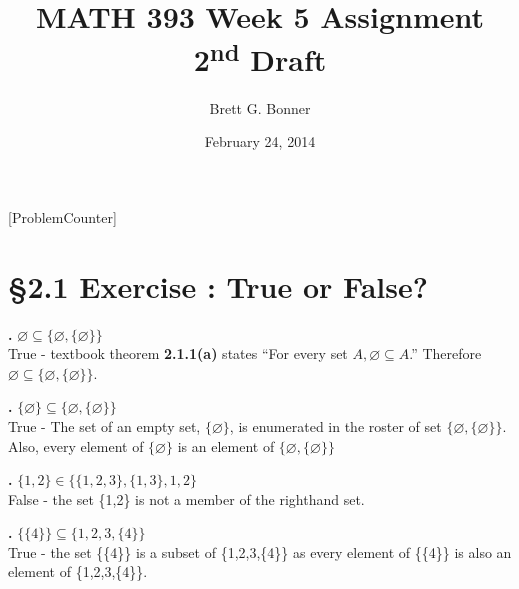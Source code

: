 \documentclass[a4paper,11pt]{article}
\begin{document}
\newtheorem*{theorem1}{Theorem}
\newtheorem*{theorem2}{Theorem}
\newtheorem*{theorem3}{Theorem}
\newtheorem*{theorem4}{Theorem}
\newtheorem*{theorem5}{Theorem}
\newtheorem*{theorem6}{Theorem}
\newtheorem*{theorem7}{Theorem}
\newtheorem*{theorem8}{Theorem}
\title{MATH 393 Week 5 Assignment 2\textsuperscript{nd} Draft}
\author{Brett G. Bonner}
\date{February 24, 2014}
\maketitle
\linespread{1.5}
[ProblemCounter]
\addtocounter{ProblemCounter}{5} %
\addtocounter{SubsectionCounter}{2} %
%

\section*{\S 2.1 Exercise : True or False?}
\textbf{.}
\( \varnothing \subseteq \{\varnothing, \{\varnothing\}\} \)\\
True - textbook theorem \textbf{2.1.1(a)} states ``For every set \(A, \varnothing \subseteq 
A\).'' Therefore \(\varnothing \subseteq \{\varnothing,\{\varnothing\}\}\).\\
\setcounter{SubsectionCounter}{4}

\noindent\textbf{.}
\( \{\varnothing\} \subseteq \{\varnothing, \{\varnothing\}\} \)\\
True - The set of an empty set, \(\{\varnothing\}\), is enumerated in the roster 
of set \(\{\varnothing, \{\varnothing\}\}\). Also, every element of \(\{\varnothing\}\) 
is an element of \(\{\varnothing, \{\varnothing\}\}\)\\
\setcounter{SubsectionCounter}{10}

\noindent\textbf{.}
\(\{1,2\} \in \{\{1,2,3\},\{1,3\},1,2\}\)\\
False - the set \{1,2\} is not a member of the righthand set.\\
\setcounter{SubsectionCounter}{12}

\noindent\textbf{.}
\(\{\{4\}\} \subseteq \{1,2,3,\{4\}\}\)\\
True - the set \{\{4\}\} is a subset of \{1,2,3,\{4\}\} as every element of \{\{4\}\} is also an element of \{1,2,3,\{4\}\}.\\
\setcounter{SubsectionCounter}{12}
\newpage
\end{document}
